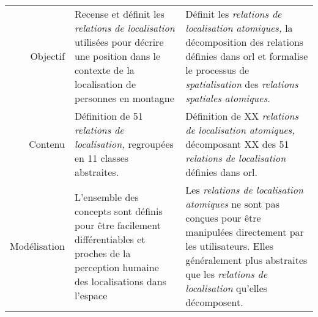 \begin{tabular}{r>{\small}p{}>{\small}p{}}
  \toprule & \multicolumn{1}{c}{\ac{orl}} &
  \multicolumn{1}{c}{\ac{orla}} \\ \midrule
  \addlinespace
  Objectif & Recense et définit les \emph{relations de localisation} utilisées
  pour décrire une position dans le contexte de la localisation de
  personnes en montagne & Définit les \emph{relations de localisation
                          atomiques,} la décomposition des relations
  définies dans \ac{orl} et formalise le processus de
                          \emph{spatialisation} des \emph{relations
                          spatiales atomiques.}\\
  Contenu & Définition de 51 \emph{relations de localisation,}
            regroupées en 11 classes abstraites. & Définition de XX
                                                   \emph{relations de
                                                   localisation
                                                   atomiques,}
                                                   décomposant XX des
                                                   51 \emph{relations
                                                   de localisation}
                                                   définies dans \ac{orl}.\\
  Modélisation & L'ensemble des concepts sont définis pour être facilement
       différentiables et proches de la perception humaine des
       localisations dans l'espace & Les \emph{relations de
                                     localisation atomiques} ne sont
                                     pas conçues pour être manipulées
                                     directement par les utilisateurs.
  Elles généralement plus abstraites que les \emph{relations de
                                     localisation} qu'elles
                                     décomposent.\\ 
  \bottomrule
\end{tabular}
